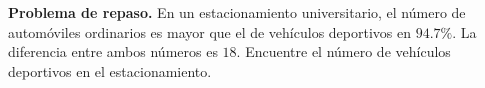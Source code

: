 \item \textbf{Problema de repaso.} En un estacionamiento universitario, el número de automóviles ordinarios es mayor que el de vehículos deportivos en $94.7\%$. La diferencia entre ambos números es $18$. Encuentre el número de vehículos deportivos en el estacionamiento.
